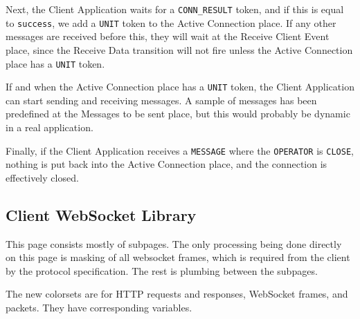 		Next, the Client Application waits for a \lstinline:CONN_RESULT: token, and if
		this is equal to \lstinline:success:, we add a \lstinline:UNIT: token to the
		Active Connection place. If any other messages are received before this, they
		will wait at the Receive Client Event place, since the Receive Data transition
		will not fire unless the Active Connection place has a \lstinline:UNIT: token.
		
		If and when the Active Connection place has a \lstinline:UNIT: token, the
		Client Application can start sending and receiving messages. A sample of
		messages has been predefined at the Messages to be sent place, but this would
		probably be dynamic in a real application.
		
		Finally, if the Client Application receives a \lstinline:MESSAGE: where the
		\lstinline:OPERATOR: is \lstinline:CLOSE:, nothing is put back into the Active
		Connection place, and the connection is effectively closed. 

\subsection{Client WebSocket Library}


	This page consists mostly of subpages. The only processing being done directly
	on this page is masking of all websocket frames, which is required from the
	client by the protocol specification. The rest is plumbing between the
	subpages.
	
	The new colorsets are for HTTP requests and responses, WebSocket frames, and
	packets. They have corresponding variables. 
	
